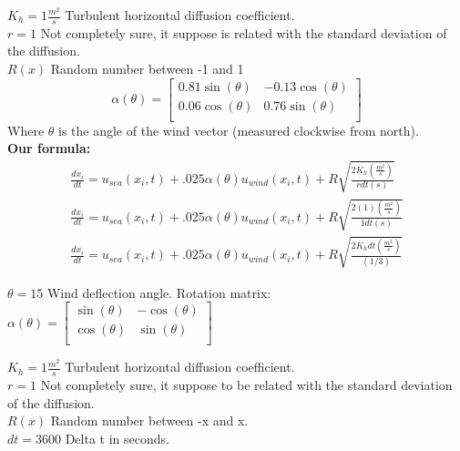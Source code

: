 \documentclass[a4paper,12pt]{article}
\begin{document}
$K_h  = 1 \frac{m^2}{s}$ Turbulent horizontal diffusion coefficient. \\
$r  = 1$ Not completely sure, it suppose is related with the standard deviation of the diffusion. \\
$R(x)$ Random number between -1 and 1 \\
\begin{equation}
\alpha(\theta)
 = 
    \begin{bmatrix}
        0.81 \sin(\theta) & -0.13\cos(\theta) \\
        0.06 \cos(\theta) & 0.76 \sin(\theta) \\
    \end{bmatrix}
\end{equation}
Where $\theta$ is the angle of the wind vector (measured clockwise from north).\\

\textbf{Our formula:}
\begin{equation}
\begin{split}
\frac{dx_i}{dt} = u_{sea}(x_i, t) + .025 \alpha(\theta) u_{wind}(x_i,t) + R \sqrt{\frac{2K_h (\frac{m^2}{s})}{r dt (s)}} \\
\frac{dx_i}{dt} = u_{sea}(x_i, t) + .025 \alpha(\theta) u_{wind}(x_i,t) + R \sqrt{\frac{2(1) (\frac{m^2}{s})}{1 dt (s)}} \\
\frac{dx_i}{dt} = u_{sea}(x_i, t) + .025 \alpha(\theta) u_{wind}(x_i,t) + R \sqrt{\frac{2K_h dt (\frac{m^2}{s})}{(1/3) }} 
\end{split}
\end{equation}

$\theta = 15$ Wind deflection angle. Rotation matrix:  
$
\alpha(\theta)
 = 
    \begin{bmatrix}
        \sin(\theta) & -\cos(\theta) \\
        \cos(\theta) & \sin(\theta) \\
    \end{bmatrix}
$

$K_h  = 1 \frac{m^2}{s}$ Turbulent horizontal diffusion coefficient. \\
$r  = 1$ Not completely sure, it suppose to be related with the standard deviation of the diffusion. \\
$R(x)$ Random number between -x and x. \\
$dt = 3600$ Delta t in seconds.\\
\end{document}

